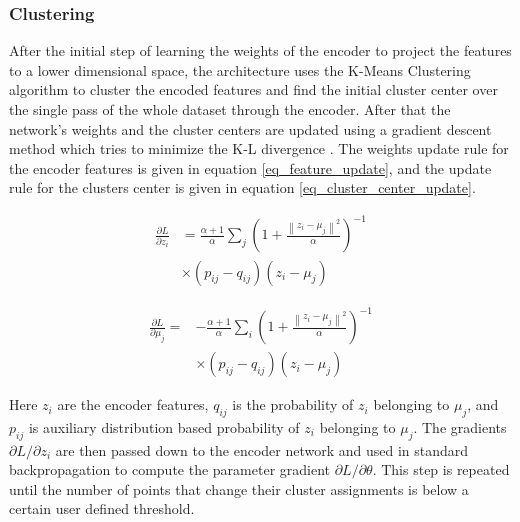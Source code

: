 \documentclass{article}
\begin{document}
\subsubsection{Clustering}
After the initial step of learning the weights of the encoder to project the features to a lower dimensional space, the architecture uses the K-Means Clustering algorithm to cluster the encoded features and find the initial cluster center over the single pass of the whole dataset through the encoder. After that the network's weights and the cluster centers are updated using a gradient descent method which tries to minimize the K-L divergence \cite{kl_divergence}. The weights update rule for the encoder features is given in equation \eqref{eq_feature_update}, and the update rule for the clusters center is given in equation \eqref{eq_cluster_center_update}.

\begin{equation}
\begin{aligned} \frac{\partial L}{\partial z_{i}} &=\frac{\alpha+1}{\alpha} \sum_{j}\left(1+\frac{\left\|z_{i}-\mu_{j}\right\|^{2}}{\alpha}\right)^{-1} \\ & \times\left(p_{i j}-q_{i j}\right)\left(z_{i}-\mu_{j}\right) \end{aligned}
\label{eq_feature_update}
\end{equation}


\begin{equation}
\begin{aligned} \frac{\partial L}{\partial \mu_{j}}=&-\frac{\alpha+1}{\alpha} \sum_{i}\left(1+\frac{\left\|z_{i}-\mu_{j}\right\|^{2}}{\alpha}\right)^{-1} \\ & \times\left(p_{i j}-q_{i j}\right)\left(z_{i}-\mu_{j}\right) \end{aligned}
\label{eq_cluster_center_update}
\end{equation}

Here $z_i$ are the encoder features, $q_{ij}$ is the probability of $z_i$ belonging to $\mu_j$, and $p_{ij}$ is auxiliary distribution based probability of $z_i$ belonging to $\mu_j$. The gradients $\partial L / \partial z_{i}$ are then passed down to the encoder network and used in standard backpropagation to compute the parameter gradient $\partial L / \partial \theta$. This step is repeated until the number of points that change their cluster assignments is below a certain user defined threshold.
\end{document}
